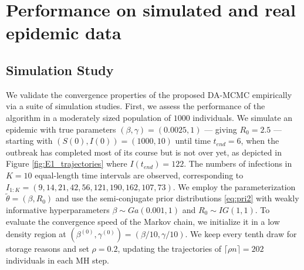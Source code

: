 \documentclass[12pt]{article}
\begin{document}

\section{Performance on simulated and real epidemic data}
\label{sec:per}

\subsection{Simulation Study}
\label{sec:sim}

We validate the convergence properties of the proposed DA-MCMC empirically via a suite of simulation studies. First, we assess the performance of the algorithm in a moderately sized population of $1000$ individuals. We simulate an epidemic with true parameters $(\beta, \gamma) = (0.0025, 1)$ --- giving $R_0 = 2.5$ --- starting with $(S(0), I(0)) = (1000, 10)$ until time $t_{end} = 6$, when the outbreak has completed most of its course but is not over yet, as depicted in Figure \ref{fig:E1_trajectories} where $I(t_{end}) = 122$. The numbers of infections in $K = 10$ equal-length time intervals are observed, corresponding to $I_{1:K} = (9, 14, 21, 42, 56, 121, 190, 162, 107, 73)$.	
We employ the parameterization $\tilde{\theta} = (\beta, R_0)$ and use the semi-conjugate prior distributions \eqref{eq:pri2} with weakly informative hyperparameters $\beta \sim Ga(0.001, 1)$ and $R_0 \sim IG(1,1)$.
To evaluate the convergence speed of the Markov chain, we initialize it in a low density region at $\left(\beta^{(0)}, \gamma^{(0)}\right) = \left(\beta/10, \gamma/10\right)$. We keep every tenth draw for storage reasons and set $\rho = 0.2$, updating the trajectories of $\lceil\rho n\rceil = 202$ individuals in each MH step.
\end{document}
